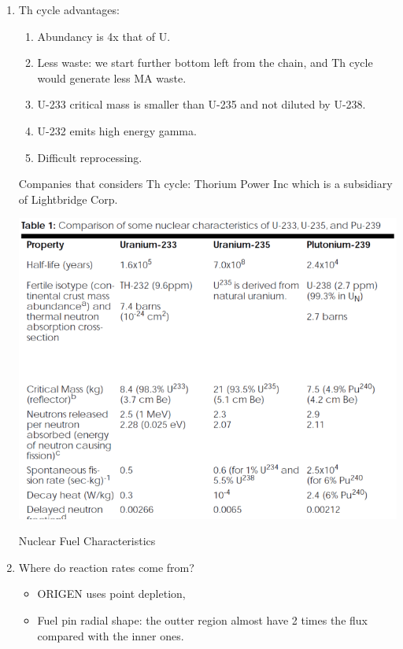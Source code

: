 \documentclass{school-22.211-notes}
\begin{document}
\begin{enumerate}
\item Th cycle advantages: 
\begin{enumerate}
\item Abundancy is 4x that of U. 
\item Less waste:  we start further bottom left from the chain, and Th cycle would generate less MA waste. 
\item U-233 critical mass is smaller than U-235 and not diluted by U-238. 
\item U-232 emits high energy gamma. 
\item Difficult reprocessing. 
\end{enumerate}
Companies that considers Th cycle: Thorium Power Inc which is a subsidiary of Lightbridge Corp. 
\begin{table}
  \centering
  \includegraphics[width=5in]{images/dfs/fuel-type.png}
  \caption{Nuclear Fuel Characteristics} 
\end{table}

\item Where do reaction rates come from? 
  \begin{itemize}
  \item ORIGEN uses point depletion, 
  \item Fuel pin radial shape: the outter region almost have 2 times the flux compared with the inner ones. 
  \end{itemize}


\end{enumerate}
\end{document}
